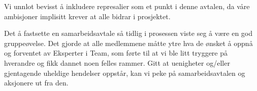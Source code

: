 Vi unnlot bevisst å inkludere represalier som et punkt i denne avtalen, da våre ambisjoner implisitt krever at alle bidrar i prosjektet.

Det å fastsette en samarbeidsavtale så tidlig i prosessen viste seg å
være en god gruppeøvelse. Det gjorde at alle medlemmene måtte ytre hva
de ønsket å oppnå og forventet av Eksperter i Team, som førte til at
vi ble litt tryggere på hverandre og fikk dannet noen felles
rammer. Gitt at uenigheter og/eller gjentagende uheldige hendelser
oppstår, kan vi peke på samarbeidsavtalen og aksjonere ut fra den.



